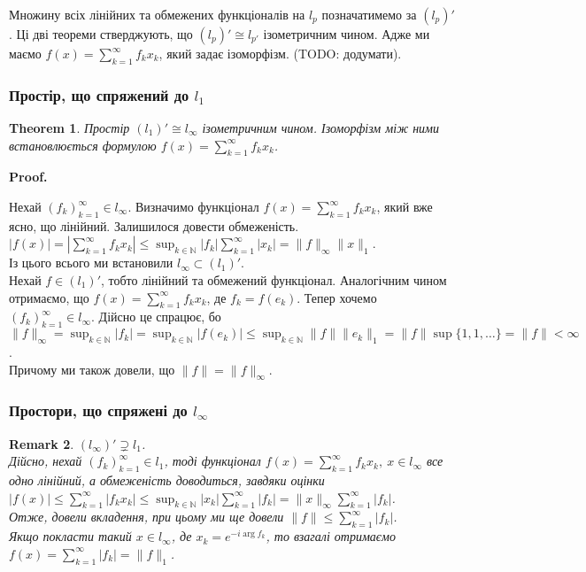 \documentclass[a4paper, 10pt]{article}
\makeatletter
\theoremstyle{theoremdd}
\newtheorem{theorem}{Theorem}[subsection]
\theoremstyle{theoremdd}
\theoremstyle{theoremdd}
\theoremstyle{theoremdd}
\theoremstyle{theoremdd}
\theoremstyle{theoremdd}
\newtheorem{remark}[theorem]{Remark}
\theoremstyle{theoremdd}
\theoremstyle{theoremdd}
\renewenvironment{proof}[1][Proof.\\]{\par
\pushQED{\hfill \qed}%
\normalfont \topsep6\p@\@plus6\p@\relax
\trivlist
\item\relax
{\bfseries
#1\@addpunct{.}}\hspace\labelsep\ignorespaces
}{%
\popQED\endtrivlist\@endpefalse
}
\makeatother
\begin{document}
Множину всіх лінійних та обмежених функціоналів на $l_p$ позначатимемо за $(l_p)'$. Ці дві теореми стверджують, що $(l_p)' \cong l_{p'}$ ізометричним чином. Адже ми маємо $f(x) = \displaystyle\sum_{k=1}^\infty f_kx_k$, який задає ізоморфізм. (TODO: додумати).

\subsubsection{Простір, що спряжений до $l_1$}
\begin{theorem}
Простір $(l_1)' \cong l_\infty$ ізометричним чином. Ізоморфізм між ними встановлюється формулою $f(x) = \displaystyle\sum_{k=1}^\infty f_k x_k$.
\end{theorem}

\begin{proof}
Нехай $(f_k)^{\infty}_{k=1} \in l_{\infty}$. Визначимо функціонал $f(x) = \displaystyle\sum_{k=1}^\infty f_k x_k$, який вже ясно, що лінійний. Залишилося довести обмеженість.\\
$|f(x)| = \displaystyle \left| \sum_{k=1}^\infty f_k x_k \right| \leq \sup_{k \in \mathbb{N}} |f_k| \sum_{k=1}^\infty |x_k| = \|f\|_\infty \|x\|_1$.\\
Із цього всього ми встановили $l_\infty \subset (l_1)'$.\\
Нехай $f \in (l_1)'$, тобто лінійний та обмежений функціонал. Аналогічним чином отримаємо, що $f(x) = \displaystyle\sum_{k=1}^\infty f_k x_k$, де $f_k = f(e_k)$. Тепер хочемо $(f_k)^{\infty}_{k=1} \in l_\infty$. Дійсно це спрацює, бо\\
$\|f\|_\infty = \displaystyle\sup_{k \in \mathbb{N}} |f_k| = \sup_{k \in \mathbb{N}} |f(e_k)| \leq \sup_{k \in \mathbb{N}} \|f\| \|e_k\|_1 = \|f\| \sup \{1,1,\dots\} = \|f\| < \infty$.\\
Причому ми також довели, що $\|f\| = \|f\|_\infty$.
\end{proof}

\subsubsection{Простори, що спряжені до $l_\infty$}
\begin{remark}
$(l_\infty)' \supsetneq l_1$.\\
Дійсно, нехай $(f_k)_{k=1}^\infty \in l_1$, тоді функціонал $f(x) = \displaystyle\sum_{k=1}^\infty f_k x_k,\ x \in l_\infty$ все одно лінійний, а обмеженість доводиться, завдяки оцінки\\
$|f(x)| \leq \displaystyle\sum_{k=1}^\infty |f_k x_k| \leq \sup_{k \in \mathbb{N}} |x_k| \sum_{k=1}^\infty |f_k| = \|x\|_\infty \sum_{k=1}^\infty |f_k|$.\\
Отже, довели вкладення, при цьому ми ще довели $\|f\| \leq \displaystyle\sum_{k=1}^\infty |f_k|$.\\
Якщо покласти такий $x \in l_\infty$, де $x_k = e^{-i \arg f_k}$, то взагалі отримаємо $f(x) = \displaystyle\sum_{k=1}^\infty |f_k| = \|f\|_1$.
\end{remark}
\end{document}
